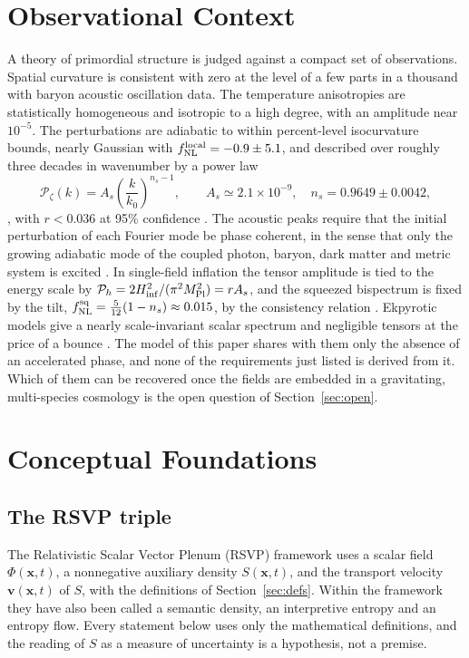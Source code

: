 \documentclass[11pt]{article}
\theoremstyle{definition}
\theoremstyle{remark}
\newcommand{\vv}{\mathbf{v}}
\newcommand{\xx}{\mathbf{x}}
\newcommand{\Pk}{\mathcal{P}}
\begin{document}
\section{Observational Context}

A theory of primordial structure is judged against a compact set of observations. Spatial curvature is consistent with zero at the level of a few parts in a thousand with baryon acoustic oscillation data. The temperature anisotropies are statistically homogeneous and isotropic to a high degree, with an amplitude near $10^{-5}$. The perturbations are adiabatic to within percent-level isocurvature bounds, nearly Gaussian with $f_{\rm NL}^{\rm local}=-0.9\pm5.1$, and described over roughly three decades in wavenumber by a power law
\begin{equation}
\Pk_\zeta(k)=A_s\left(\frac{k}{k_0}\right)^{n_s-1},\qquad A_s\simeq2.1\times10^{-9},\quad n_s=0.9649\pm0.0042,
\end{equation}
\cite{planck2018vi,planck2018ix}, with $r<0.036$ at 95\% confidence \cite{bicep2021}. The acoustic peaks require that the initial perturbation of each Fourier mode be phase coherent, in the sense that only the growing adiabatic mode of the coupled photon, baryon, dark matter and metric system is excited \cite{albrecht1996,hu2002}. In single-field inflation the tensor amplitude is tied to the energy scale by $\Pk_h=2H_{\rm inf}^2/(\pi^2M_{\rm Pl}^2)=rA_s$, and the squeezed bispectrum is fixed by the tilt, $f_{\rm NL}^{\rm sq}=\tfrac5{12}(1-n_s)\approx0.015$, by the consistency relation \cite{maldacena2003,creminelli2004}. Ekpyrotic models give a nearly scale-invariant scalar spectrum and negligible tensors at the price of a bounce \cite{khoury2001,steinhardt2002}. The model of this paper shares with them only the absence of an accelerated phase, and none of the requirements just listed is derived from it. Which of them can be recovered once the fields are embedded in a gravitating, multi-species cosmology is the open question of Section~\ref{sec:open}.

\section{Conceptual Foundations}\label{sec:concept}

\subsection{The RSVP triple}

The Relativistic Scalar Vector Plenum (RSVP) framework uses a scalar field $\Phi(\xx,t)$, a nonnegative auxiliary density $S(\xx,t)$, and the transport velocity $\vv(\xx,t)$ of $S$, with the definitions of Section~\ref{sec:defs}. Within the framework they have also been called a semantic density, an interpretive entropy and an entropy flow. Every statement below uses only the mathematical definitions, and the reading of $S$ as a measure of uncertainty is a hypothesis, not a premise.
\end{document}
